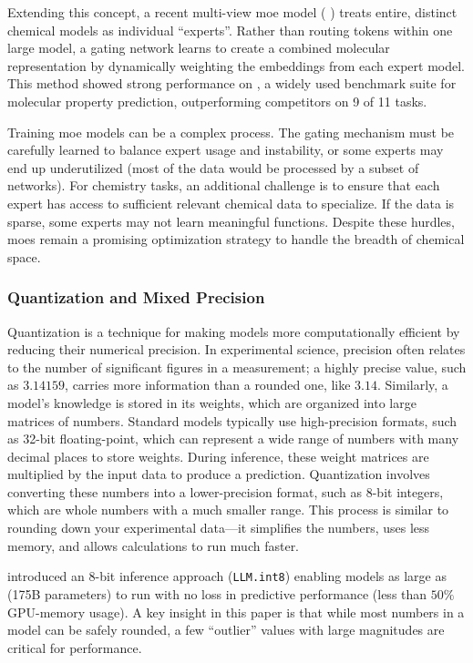 Extending this concept, a recent multi-view \gls{moe} model ( \autocite{shirasuna2024multi}) treats entire, distinct chemical models as individual \enquote{experts}. Rather than routing tokens within one large model, a gating network learns to create a combined molecular representation by dynamically weighting the embeddings from each expert model. This method showed strong performance on , a widely used benchmark suite for molecular property prediction, outperforming competitors on 9 of 11 tasks.


Training \gls{moe} models can be a complex process. The gating mechanism must be carefully learned to balance expert usage and instability, or some experts may end up underutilized (most of the data would be processed by a subset of networks). \autocite {fedus2022switch} For chemistry tasks, an additional challenge is to ensure that each expert has access to sufficient relevant chemical data to specialize. If the data is sparse, some experts may not learn meaningful functions. Despite these hurdles, \glspl{moe} remain a promising optimization strategy to handle the breadth of chemical space.



\subsubsection{Quantization and Mixed Precision}
\label{sec:quantization}
Quantization is a technique for making models more computationally efficient by reducing their numerical precision. 
In experimental science, precision often relates to the number of significant figures in a measurement; a highly precise value, such as $3.14159$, carries more information than a rounded one, like $3.14$. 
Similarly, a model's knowledge is stored in its weights, which are organized into large matrices of numbers. Standard models typically use high-precision formats, such as 32-bit floating-point, which can represent a wide range of numbers with many decimal places to store weights. During inference, these weight matrices are multiplied by the input data to produce a prediction. Quantization involves converting these numbers into a lower-precision format, such as 8-bit integers, which are whole numbers with a much smaller range. This process is similar to rounding down your experimental data---it simplifies the numbers, uses less memory, and allows calculations to run much faster.

 
\textcite{dettmers2022gpt3} introduced an 8-bit inference approach (\texttt{LLM.int8}) enabling models as large as  (175B parameters) to run with no loss in predictive performance (less than $50\%$ GPU-memory usage).  
A key insight in this paper is that while most numbers in a model can be safely rounded, a few \enquote{outlier} values with large magnitudes are critical for performance. 

